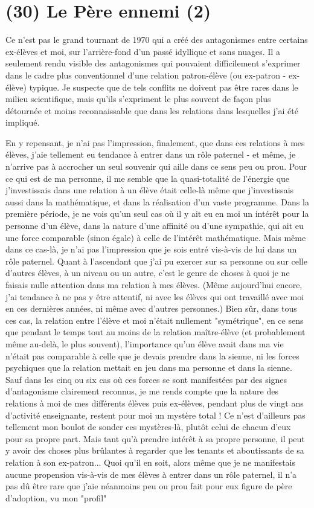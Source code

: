 \section{(30) Le Père ennemi (2)}

Ce n'est pas le grand tournant de 1970 qui a créé des antagonismes entre certains ex-élèves et moi, sur l'arrière-fond d'un passé idyllique et sans nuages. Il a seulement rendu visible des antagonismes qui pouvaient difficilement s'exprimer dans le cadre plus conventionnel d'une relation patron-élève (ou ex-patron - ex-élève) typique. Je suspecte que de tels conflits ne doivent pas être rares dans le milieu scientifique, mais qu'ils s'expriment le plus souvent de façon plus détournée et moins reconnaissable que dans les relations dans lesquelles j'ai été impliqué.

En y repensant, je n'ai pas l'impression, finalement, que dans ces relations à mes élèves, j'aie tellement eu tendance à entrer dans un rôle paternel - et même, je n'arrive pas à accrocher un seul souvenir qui aille dans ce sens peu ou prou. Pour ce qui est de ma personne, il me semble que la quasi-totalité de l'énergie que j'investissais dans une relation à un élève était celle-là même que j'investissais aussi dans la mathématique, et dans la réalisation d'un vaste programme. Dans la première période, je ne vois qu'un seul cas où il y ait eu en moi un intérêt pour la personne d'un élève, dans la nature d'une affinité ou d'une sympathie, qui ait eu une force comparable (sinon égale) à celle de l'intérêt mathématique. Mais même dans ce cas-là, je n'ai pas l'impression que je sois entré vis-à-vis de lui dans un rôle paternel. Quant à l'ascendant que j'ai pu exercer sur sa personne ou sur celle d'autres élèves, à un niveau ou un autre, c'est le genre de choses à quoi je ne faisais nulle attention dans ma relation à mes élèves. (Même aujourd'hui encore, j'ai tendance à ne pas y être attentif, ni avec les élèves qui ont travaillé avec moi en ces dernières années, ni même avec d'autres personnes.) Bien sûr, dans tous ces cas, la relation entre l'élève et moi n'était nullement "symétrique", en ce sens que pendant le temps tout au moins de la relation maître-élève (et probablement même au-delà, le plus souvent), l'importance qu'un élève avait dans ma vie n'était pas comparable à celle que je devais prendre dans la sienne, ni les forces psychiques que la relation mettait en jeu dans ma personne et dans la sienne. Sauf dans les cinq ou six cas où ces forces se sont manifestées par des signes d'antagonisme clairement reconnus, je me rends compte que la nature des relations à moi de mes différents élèves puis ex-élèves, pendant plus de vingt ans d'activité enseignante, restent pour moi un mystère total ! Ce n'est d'ailleurs pas tellement mon boulot de sonder ces mystères-là, plutôt celui de chacun d'eux pour sa propre part. Mais tant qu'à prendre intérêt à sa propre personne, il peut y avoir des choses plus brûlantes à regarder que les tenants et aboutissants de sa relation à son ex-patron... Quoi qu'il en soit, alors même que je ne manifestais aucune propension vis-à-vis de mes élèves à entrer dans un rôle paternel, il n'a pas dû être rare que j'aie néanmoins peu ou prou fait pour eux figure de père d'adoption, vu mon "profil" 